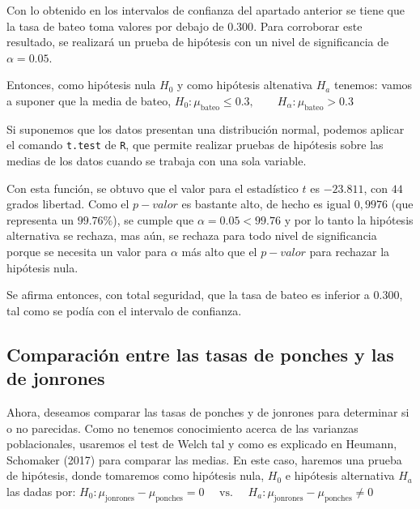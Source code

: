 \documentclass{staprojteamusb}
\begin{document}
 Con lo obtenido en los intervalos de confianza del apartado anterior se tiene que la tasa de bateo toma valores por debajo de \(0.300\). Para corroborar este resultado, se realizará un prueba de hipótesis con un nivel de significancia de \(\alpha=0.05\).

 Entonces, como hipótesis nula \(H_{0}\) y como hipótesis altenativa \(H_{a}\) tenemos: vamos a suponer que la media de bateo, \(H_{0}: \mu_{\operatorname{bateo}}\leq 0.3,\qquad H_{\alpha}: \mu_{\operatorname{bateo}}> 0.3\)

 Si suponemos que los datos presentan una distribución normal, podemos aplicar el comando \texttt{t.test} de \texttt{R}, que permite realizar pruebas de hipótesis sobre las medias de los datos cuando se trabaja con una sola variable.

 Con esta función, se obtuvo que el valor para el estadístico \(t\) es \(-23.811\), con \(44\) grados libertad. Como el \(p-valor\) es bastante alto, de hecho es igual \(0,9976\) (que representa un \(99.76\%\)), se cumple que \(\alpha=0.05<99.76\) y por lo tanto la hipótesis alternativa se rechaza, mas aún, se rechaza para todo nivel de significancia porque se necesita un valor para \(\alpha\) más alto que el \(p-valor\) para rechazar la hipótesis nula.

 Se afirma entonces, con total seguridad, que la tasa de bateo es inferior a \(0.300\), tal como se podía con el intervalo de confianza.

 \hypertarget{comparaciuxf3n-entre-las-tasas-de-ponches-y-las-de-jonrones}{%
 \subsection{Comparación entre las tasas de ponches y las de jonrones}\label{comparaciuxf3n-entre-las-tasas-de-ponches-y-las-de-jonrones}}

 Ahora, deseamos comparar las tasas de ponches y de jonrones para determinar si o no parecidas. Como no tenemos conocimiento acerca de las varianzas poblacionales, usaremos el test de Welch tal y como es explicado en Heumann, Schomaker (2017) para comparar las medias. En este caso, haremos una prueba de hipótesis, donde tomaremos como hipótesis nula, \(H_{0}\) e hipótesis alternativa \(H_{a}\) las dadas por: \linebreak 
 \(H_0 : \mu_{\operatorname{jonrones}} - \mu_{\operatorname{ponches}} = 0 \quad \text{ vs. } \quad H_a : \mu_{\operatorname{jonrones}} - \mu_{\operatorname{ponches}} \neq 0\)
\end{document}
